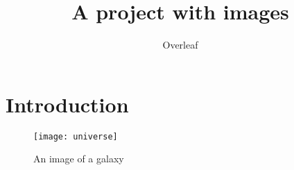 \documentclass{article}
\title{A project with images}
\author{Overleaf}
\date{}
\begin{document}
\maketitle

\section{Introduction}
\begin{figure}[htp]
    \centering
    \texttt{[image: universe]}
    \caption{An image of a galaxy}
    \label{fig:galaxy}
\end{figure}
\end{document}
